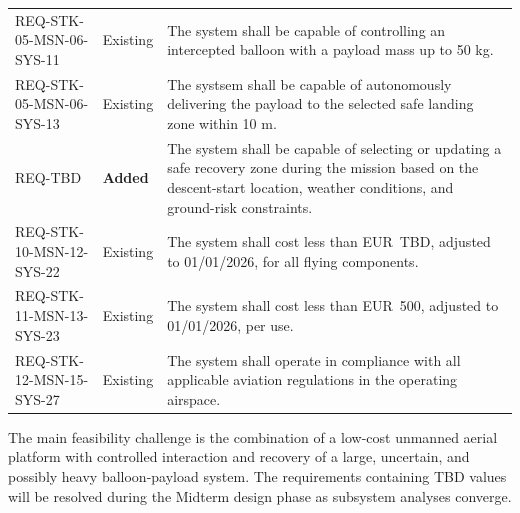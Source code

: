 \begin{xltabular}{\textwidth}{@{}p{0.28\textwidth} p{0.14\textwidth} X@{}}
\addlinespace
REQ-STK-05-MSN-06-SYS-11 &
Existing &
The system shall be capable of controlling an intercepted
balloon with a payload mass up to 50 kg. \\

\addlinespace
REQ-STK-05-MSN-06-SYS-13 &
Existing &
The systsem shall be capable of autonomously delivering
the payload to the selected safe landing zone within 10 m. \\

\addlinespace
REQ-TBD &
\textbf{Added} &
The system shall be capable of selecting or updating a safe
recovery zone during the mission based on the descent-start
location, weather conditions, and ground-risk constraints. \\

\addlinespace
REQ-STK-10-MSN-12-SYS-22 &
Existing &
The system shall cost less than EUR~TBD, adjusted to
01/01/2026, for all flying components. \\

\addlinespace
REQ-STK-11-MSN-13-SYS-23 &
Existing &
The system shall cost less than EUR~500, adjusted to
01/01/2026, per use. \\

\addlinespace
REQ-STK-12-MSN-15-SYS-27 &
Existing &
The system shall operate in compliance with all applicable
aviation regulations in the operating airspace. \\

\end{xltabular}
\endgroup



\noindent The main feasibility challenge is the combination of
a low-cost unmanned aerial platform with controlled interaction
and recovery of a large, uncertain, and possibly heavy
balloon-payload system. The requirements containing TBD values
will be resolved during the Midterm design phase as subsystem
analyses converge.



